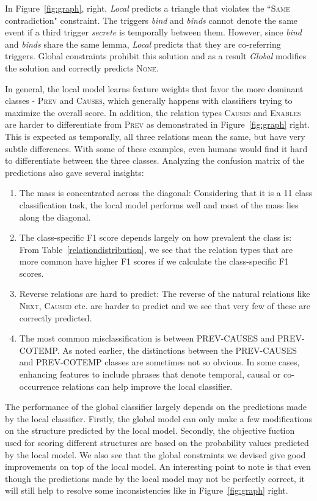 In Figure~\ref{fig:graph}, right, \emph{Local} predicts a triangle that violates the ``\textsc{Same} contradiction" constraint. The triggers \emph{bind} and \emph{binds} cannot denote the same event if a third trigger \emph{secrete} is temporally between them. However, since \emph{bind} and \emph{binds} share the same lemma, \emph{Local} predicts that they are co-referring triggers. Global constraints prohibit this solution and as a result \emph{Global} modifies the solution and correctly predicts \textsc{None}.

In general, the local model learns feature weights that favor the more dominant classes - \textsc{Prev} and \textsc{Causes}, which generally happens with classifiers trying to maximize the overall score. In addition, the relation types \textsc{Causes} and \textsc{Enables} are harder to differentiate from \textsc{Prev} as demonstrated in Figure~\ref{fig:graph} right. This is expected as temporally, all three relations mean the same, but have very subtle differences. With some of these examples, even humans would find it hard to differentiate between the three classes. Analyzing the confusion matrix of the predictions also gave several insights:
\begin{enumerate}
\item The mass is concentrated across the diagonal: Considering that it is a 11 class classification task, the local model performs well and most of the mass lies along the diagonal.
\item The class-specific F1 score depends largely on how prevalent the class is: From Table~\ref{relationdistribution}, we see that the relation types that are more common have higher F1 scores if we calculate the class-specific F1 scores.
\item Reverse relations are hard to predict: The reverse of the natural relations like \textsc{Next}, \textsc{Caused} etc. are harder to predict and we see that very few of these are correctly predicted.
\item The most common misclassification is between PREV-CAUSES and PREV-COTEMP. As noted earlier, the distinctions between the PREV-CAUSES and PREV-COTEMP classes are sometimes not so obvious. In some cases, enhancing features to include phrases that denote temporal, causal or co-occurrence relations can help improve the local classifier.
\end{enumerate}

The performance of the global classifier largely depends on the predictions made by the local classifier. Firstly, the global model can only make a few modifications on the structure predicted by the local model. Secondly, the objective fuction used for scoring different structures are based on the probability values predicted by the local model. We also see that the global constraints we devised give good improvements on top of the local model. An interesting point to note is that even though the predictions made by the local model may not be perfectly correct, it will still help to resolve some inconsistencies like in Figure~\ref{fig:graph} right.
